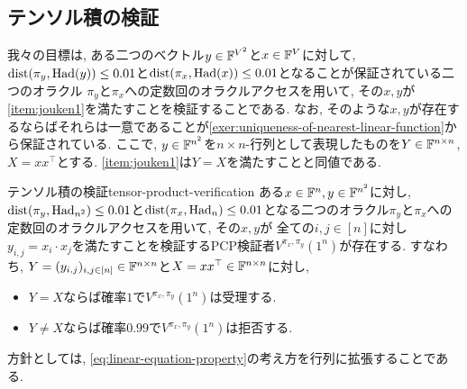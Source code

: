   \subsection{テンソル積の検証}
  我々の目標は, 
  ある二つのベクトル$y\in\mathbb{F}^{V^2}$と$x\in\mathbb{F}^V$に対して, $\mathrm{dist}(\pi_y,\mathrm{Had}(y))\le 0.01$と$\mathrm{dist}(\pi_x,\mathrm{Had}(x))\le 0.01$となることが保証されている二つのオラクル
  $\pi_y$と$\pi_x$への定数回のオラクルアクセスを用いて, その$x,y$が
  \ref{item:jouken1}を満たすことを検証することである.
  なお, そのような$x,y$が存在するならばそれらは一意であることが\cref{exer:uniqueness-of-nearest-linear-function}から保証されている.
  ここで, $y\in\mathbb{F}^{n^2}$を$n\times n$-行列として表現したものを$Y\in\mathbb{F}^{n\times n}$, $X=xx^\top$とする. \ref{item:jouken1}は$Y=X$を満たすことと同値である.

  \begin{lemma}{テンソル積の検証}{tensor-product-verification}
    ある$x\in\mathbb{F}^n,y\in\mathbb{F}^{n^2}$に対し, $\mathrm{dist}(\pi_y,\mathrm{Had}_{n^2})\le 0.01$と$\mathrm{dist}(\pi_x,\mathrm{Had}_n)\le 0.01$となる二つのオラクル$\pi_y$と$\pi_x$への定数回のオラクルアクセスを用いて, その$x,y$が
    全ての$i,j\in [n]$に対し$y_{i,j}=x_i\cdot x_j$を満たすことを検証するPCP検証者$V^{\pi_x,\pi_y}(1^n)$が存在する.
    すなわち, $Y=(y_{i,j})_{i,j\in [n]}\in\mathbb{F}^{n\times n}$と$X=xx^\top \in \mathbb{F}^{n\times n}$に対し,
    \begin{itemize}
      \item $Y=X$ならば確率$1$で$V^{\pi_x,\pi_y}(1^n)$は受理する.
      \item $Y\ne X$ならば確率$0.99$で$V^{\pi_x,\pi_y}(1^n)$は拒否する.
    \end{itemize}
  \end{lemma}
    
  方針としては, \cref{eq:linear-equation-property}の考え方を行列に拡張することである.
  
